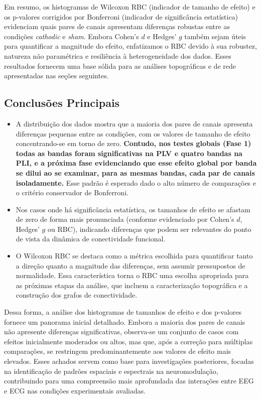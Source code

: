 Em resumo, os histogramas de Wilcoxon RBC (indicador de tamanho de efeito) e os p-valores corrigidos por Bonferroni (indicador de significância estatística) evidenciam quais pares de canais apresentam diferenças robustas entre as condições \textit{cathodic} e \textit{sham}. Embora Cohen's \(d\) e Hedges' \(g\)  também sejam úteis para quantificar a magnitude do efeito, enfatizamos o RBC devido à sua robustez, natureza não paramétrica e resiliência à heterogeneidade dos dados. Esses resultados fornecem uma base sólida para as análises topográficas e de rede apresentadas nas seções seguintes.

\subsection{Conclusões Principais}
\begin{itemize}
    \item A distribuição dos dados mostra que a maioria dos pares de canais apresenta diferenças pequenas entre as condições, com os valores de tamanho de efeito concentrando-se em torno de zero. \textbf{Contudo, nos testes globais (Fase 1) todas as bandas foram significativas na PLV e quatro bandas na PLI, e a próxima fase evidenciando que esse efeito global por banda se dilui ao se examinar, para as mesmas bandas, cada par de canais isoladamente.} Esse padrão é esperado dado o alto número de comparações e o critério conservador de Bonferroni.
    \item Nos casos onde há significância estatística, os tamanhos de efeito se afastam de zero de forma mais pronunciada (conforme evidenciado por Cohen's \(d\), Hedges' \(g\)  ou RBC), indicando diferenças que podem ser relevantes do ponto de vista da dinâmica de conectividade funcional.
    \item O Wilcoxon RBC se destaca como a métrica escolhida para quantificar tanto a direção quanto a magnitude das diferenças, sem assumir pressupostos de normalidade. Essa característica torna o RBC uma escolha apropriada para as próximas etapas da análise, que incluem a caracterização topográfica e a construção dos grafos de conectividade.
\end{itemize}

Dessa forma, a análise dos histogramas de tamanhos de efeito e dos p-valores fornece um panorama inicial detalhado. Embora a maioria dos pares de canais não apresente diferenças significativas, observa-se um conjunto de casos com efeitos inicialmente moderados ou altos, mas que, após a correção para múltiplas comparações, se restringem predominantemente aos valores de efeito mais elevados. Esses achados servem como base para investigações posteriores, focadas na identificação de padrões espaciais e espectrais na neuromodulação, contribuindo para uma compreensão mais aprofundada das interações entre EEG e ECG nas condições experimentais avaliadas.